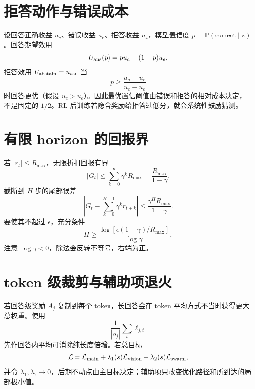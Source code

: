 \documentclass[11pt]{article}
\numberwithin{equation}{section}
\newcommand{\Pp}{\mathbb{P}}
\newcommand{\1}{\mathbf{1}}
\newcommand{\cL}{\mathcal{L}}
\begin{document}
\section{拒答动作与错误成本}

设回答正确收益 $u_c$、错误收益 $u_e$、拒答收益 $u_a$，模型置信度
$p=\Pp(\text{correct}\mid s)$。回答期望效用
\begin{equation}
 U_{\rm ans}(p)=pu_c+(1-p)u_e,
\end{equation}
拒答效用 $U_{\rm abstain}=u_a$。当
\begin{equation}
 p\ge\frac{u_a-u_e}{u_c-u_e}
\end{equation}
时回答更优（假设 $u_c>u_e$）。因此最优置信阈值由错误和拒答的相对成本决定，
不是固定的 $1/2$。RL 后训练若隐含奖励给拒答过低分，就会系统性鼓励猜测。

\section{有限 horizon 的回报界}

若 $|r_t|\le R_{\max}$，无限折扣回报有界
\begin{equation}
 |G_t|\le\sum_{k=0}^{\infty}\gamma^kR_{\max}
 =\frac{R_{\max}}{1-\gamma}.
\end{equation}
截断到 $H$ 步的尾部误差
\begin{equation}
 \left|G_t-\sum_{k=0}^{H-1}\gamma^kr_{t+k}\right|
 \le\frac{\gamma^HR_{\max}}{1-\gamma}.
\end{equation}
要使其不超过 $\epsilon$，充分条件
\begin{equation}
 H\ge\frac{\log[\epsilon(1-\gamma)/R_{\max}]}{\log\gamma},
\end{equation}
注意 $\log\gamma<0$，除法会反转不等号，右端为正。

\section{token 级裁剪与辅助项退火}
若回答级奖励 $A_j$ 复制到每个 token，长回答会在 token 平均方式不当时获得更大总权重。使用
\begin{equation}
  \frac1{|o_j|}\sum_t\ell_{j,t}
\end{equation}
先作回答内平均可消除纯长度倍增。若总目标
\begin{equation}
  \cL=\cL_{\rm main}+\lambda_1(s)\cL_{\rm vision}
  +\lambda_2(s)\cL_{\rm swarm},
\end{equation}
并令 $\lambda_1,\lambda_2\to0$，后期不动点由主目标决定；辅助项只改变优化路径和所到达的局部极小值。
\end{document}

